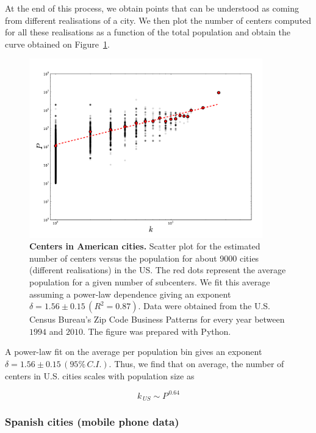 At the end of this process, we obtain points that can be understood as coming
from different realisations of a city. We then plot the number of centers
computed for all these realisations as a function of the total population and
obtain the curve obtained on Figure~\ref{fig:us_centers}.

\begin{figure}
    \centering
    \includegraphics[width=0.9\textwidth]{gfx/chapter-monocentric/us_num-centers.pdf}
    \caption{{\bf Centers in American cities.} Scatter plot for the estimated number of centers versus the
    population for about 9000 cities (different realisations) in the US. The red
dots represent the average population for a given number of subcenters. We fit
this average assuming a power-law dependence giving an exponent $\delta = 1.56
    \pm 0.15\,(R^2=0.87)$. Data were obtained from the U.S. Census Bureau's Zip
Code Business Patterns for every year between $1994$ and $2010$. The figure was
prepared with Python.\label{fig:us_centers}}
\end{figure}


A power-law fit on the average per population bin gives an exponent $\delta =
1.56 \pm 0.15\,(95\%\,C.I.)$. Thus, we find that on average, the number of
centers in U.S. cities scales with population size as

\begin{equation}
    k_{\,US} \sim P^{\,0.64}
\end{equation}

\subsubsection{Spanish cities (mobile phone data)}
\label{sub:spanish_cities_mobile_phone_data_}

